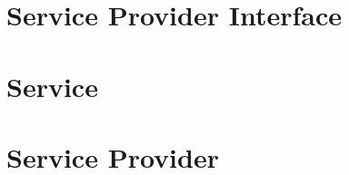 \documentclass[a4paper,10pt]{report}
\begin{document}



\tableofcontents
\clearpage

\part{Service Provider Interface}\label{vol:spi}


\part{Service}\label{vol:srv}



%

\part{Service Provider}\label{vol:sp}



\clearpage
\listoffigures
\listoftables
\listoflistings
\printindex
\end{document}
